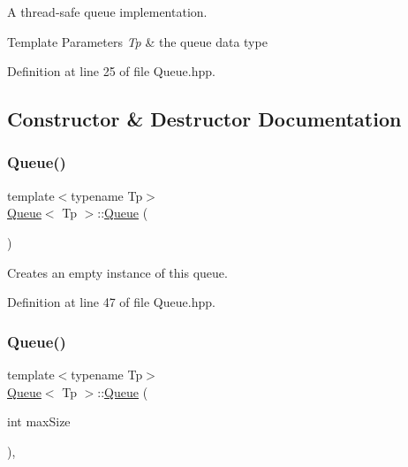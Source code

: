 A thread-\/safe queue implementation.


\begin{DoxyTemplParams}{Template Parameters}
{\em Tp} & the queue data type \\
\hline
\end{DoxyTemplParams}


Definition at line 25 of file Queue.\+hpp.



\subsection{Constructor \& Destructor Documentation}
\mbox{\label{classQueue_a71a0de9bb1e4bf3f36f3ed033398eeff}} 
\subsubsection{\texorpdfstring{Queue()}{Queue()}\hspace{0.1cm}{\footnotesize\ttfamily [1/2]}}
{\footnotesize\ttfamily template$<$typename Tp$>$ \\
\mbox{\hyperlink{classQueue}{Queue}}$<$ Tp $>$\+::\mbox{\hyperlink{classQueue}{Queue}} (\begin{DoxyParamCaption}{ }\end{DoxyParamCaption})\hspace{0.3cm}{\ttfamily [inline]}}

Creates an empty instance of this queue. 

Definition at line 47 of file Queue.\+hpp.


\begin{DoxyCode}{0}

\end{DoxyCode}
\mbox{\label{classQueue_a9c828c8a0b58c579eaa0279b9ebfe2f1}} 
\subsubsection{\texorpdfstring{Queue()}{Queue()}\hspace{0.1cm}{\footnotesize\ttfamily [2/2]}}
{\footnotesize\ttfamily template$<$typename Tp$>$ \\
\mbox{\hyperlink{classQueue}{Queue}}$<$ Tp $>$\+::\mbox{\hyperlink{classQueue}{Queue}} (\begin{DoxyParamCaption}\item[{int}]{max\+Size }\end{DoxyParamCaption})\hspace{0.3cm}{\ttfamily [inline]}, {\ttfamily [explicit]}}

